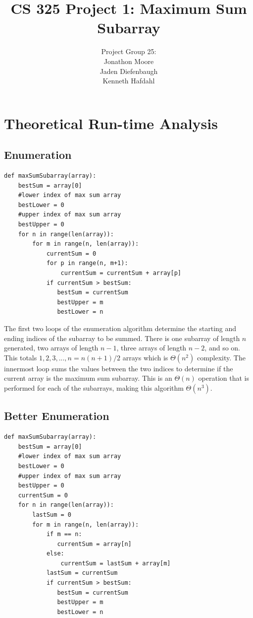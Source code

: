 \documentclass[letWterpaper,10pt,titlepage]{article}
\begin{document}
\title{CS 325 Project 1: Maximum Sum Subarray}
\author{Project Group 25:\\Jonathon Moore\\Jaden Diefenbaugh\\Kenneth Hafdahl}
\maketitle

\section{Theoretical Run-time Analysis}

\subsection{Enumeration}

\begin{lstlisting}
def maxSumSubarray(array):
    bestSum = array[0]
    #lower index of max sum array
    bestLower = 0
    #upper index of max sum array
    bestUpper = 0
    for n in range(len(array)):
        for m in range(n, len(array)):
            currentSum = 0
            for p in range(n, m+1):
                currentSum = currentSum + array[p]
            if currentSum > bestSum:
               bestSum = currentSum
               bestUpper = m
               bestLower = n
\end{lstlisting}

The first two loops of the enumeration algorithm determine the starting and ending indices of the subarray to be summed. There is one subarray of length $n$ generated, two arrays of length $n-1$, three arrays of length $n-2$, and so on. This totals $1, 2, 3, ..., n={n(n+1)}/2$ arrays which is $\Theta(n^2)$ complexity. The innermost loop sums the values between the two indices to determine if the current array is the maximum sum subarray. This is an $\Theta(n)$ operation that is performed for each of the subarrays, making this algorithm $\Theta(n^3)$.

\subsection{Better Enumeration}

\begin{lstlisting}
def maxSumSubarray(array):
    bestSum = array[0]
    #lower index of max sum array
    bestLower = 0
    #upper index of max sum array
    bestUpper = 0
    currentSum = 0
    for n in range(len(array)):
        lastSum = 0
        for m in range(n, len(array)):
            if m == n:
               currentSum = array[n]
            else:
                currentSum = lastSum + array[m]
            lastSum = currentSum
            if currentSum > bestSum:
               bestSum = currentSum
               bestUpper = m
               bestLower = n
\end{lstlisting}
\end{document}
